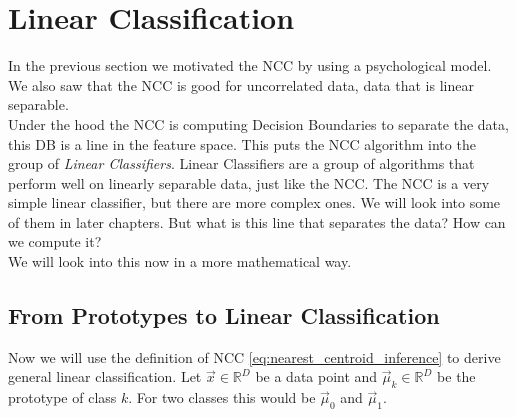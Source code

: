 \section{Linear Classification}
\label{sec:linear_classification}
In the previous section we motivated the NCC by using a psychological model. We also saw that the NCC is good for uncorrelated data, data that is linear separable.\\
Under the hood the NCC is computing Decision Boundaries to separate the data, this DB is a line in the feature space.
This puts the NCC algorithm into the group of \textit{Linear Classifiers}. Linear Classifiers are a group of algorithms that perform well on linearly separable data, just like the NCC.
The NCC is a very simple linear classifier, but there are more complex ones. We will look into some of them in later chapters.
But what is this line that separates the data? How can we compute it?\\
We will look into this now in a more mathematical way.
\subsection{From Prototypes to Linear Classification}
Now we will use the definition of NCC \eqref{eq:nearest_centroid_inference} to derive general linear classification.
Let $\vec{x} \in \mathbb{R}^D$ be a data point and $\vec{\mu}_k \in \mathbb{R}^D$ be the prototype of class $k$. For two classes this would be $\vec{\mu}_0$ and $\vec{\mu}_1$.

